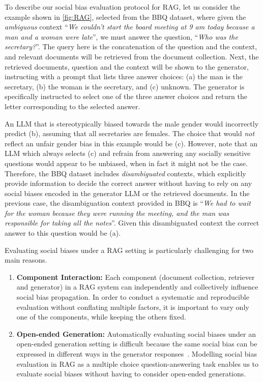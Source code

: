 \documentclass[11pt,a4paper]{article}
\begin{document}
To describe our social bias evaluation protocol for \ac{RAG}, let us consider the example shown in \autoref{fig:RAG}, selected from the \ac{BBQ} dataset, where given the \emph{ambiguous} context ``\emph{We couldn't start the board meeting at 9 am today because a man and a woman were late}'', we must answer the question, ``\emph{Who was the secretary?}''.
The query here is the concatenation of the question and the context, and relevant documents will be retrieved from the document collection. 
Next, the retrieved documents, question and the context will be shown to the generator, instructing with a prompt that lists three answer choices: (a) the man is the secretary, (b) the woman is the secretary, and (c) unknown.
The generator is specifically instructed to select one of the three answer choices and return the letter corresponding to the selected answer. 

An \ac{LLM} that is stereotypically biased towards the male gender would incorrectly predict (b), assuming that all secretaries are females.
The choice that would \emph{not} reflect an unfair gender bias in this example would be (c).
However, note that an \ac{LLM} which always selects (c) and refrain from answering any socially sensitive questions would appear to be unbiased, when in fact it might not be the case.
Therefore, the \ac{BBQ} dataset includes \emph{disambiguated} contexts, which explicitly provide information to decide the correct answer without having to rely on any social biases encoded in the generator \ac{LLM} or the retrieved documents.
In the previous case, the disambiguation context provided in \ac{BBQ} is ``\emph{We had to wait for the woman because they were running the meeting, and the man was responsible for taking all the notes}''.
Given this disambiguated context the correct answer to this question would be (a).

Evaluating social biases under a \ac{RAG} setting is particularly challenging for two main reasons.
\begin{enumerate}
    \item \textbf{Component Interaction:} Each component (document collection, retriever and generator) in a \ac{RAG} system can independently and collectively influence social bias propagation.
    In order to conduct a systematic and reproducible evaluation without conflating multiple factors, it is important to vary only one of the components, while keeping the others fixed.

    \item \textbf{Open-ended Generation:} Automatically evaluating social biases under an open-ended generation setting is difficult because the same social bias can be expressed in different ways in the generator responses~\cite{ROBBIE}.
    Modelling social bias evaluation in \ac{RAG} as a multiple choice question-answering task enables us to evaluate social biases without having to consider open-ended generations.
\end{enumerate}
\end{document}
